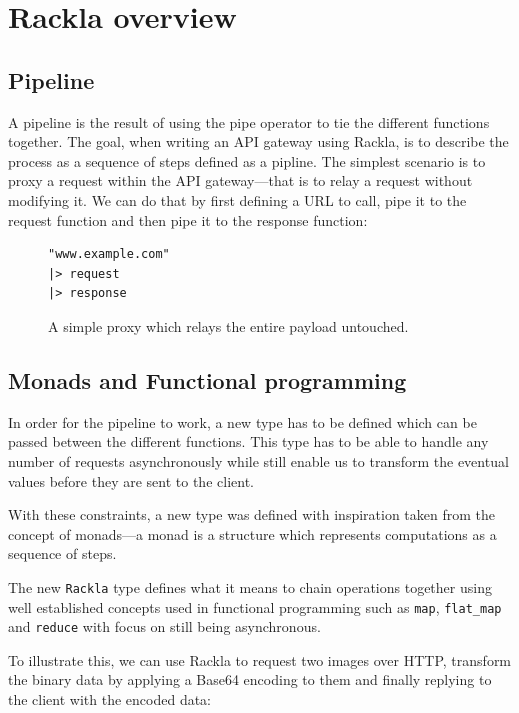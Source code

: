\documentclass{cslthse-msc}
\begin{document}
\section{Rackla overview}

\subsection{Pipeline}
A pipeline is the result of using the pipe operator to tie the different functions together. The goal, when writing an API gateway using Rackla, is to describe the process as a sequence of steps defined as a pipline. The simplest scenario is to proxy a request within the API gateway---that is to relay a request without modifying it. We can do that by first defining a URL to call, pipe it to the request function and then pipe it to the response function:

\begin{figure}[H]
  \centering
\begin{lstlisting}[breaklines=true,frame=single]
"www.example.com"
|> request
|> response
\end{lstlisting}
  \caption{A simple proxy which relays the entire payload untouched.}
\end{figure}

\subsection{Monads and Functional programming}
In order for the pipeline to work, a new type has to be defined which can be passed between the different functions. This type has to be able to handle any number of requests asynchronously while still enable us to transform the eventual values before they are sent to the client.

With these constraints, a new type was defined with inspiration taken from the concept of monads---a monad is a structure which represents computations as a sequence of steps.

The new \lstinline{Rackla} type defines what it means to chain operations together using well established concepts used in functional programming such as \lstinline{map}, \lstinline{flat_map} and \lstinline{reduce} with focus on still being asynchronous.

To illustrate this, we can use Rackla to request two images over HTTP, transform the binary data by applying a Base64 encoding to them and finally replying to the client with the encoded data:
\end{document}

